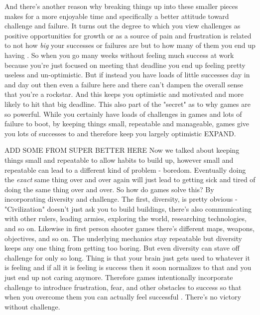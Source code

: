 \documentclass[11pt,a5paper]{book}
\begin{document}
And there's another reason why breaking things up into these smaller pieces makes for a more enjoyable time and specifically a better attitude toward challenge and failure. It turns out the degree to which you view challenges as positive opportunities for growth or as a source of pain and frustration is related to not how \textit{big} your successes or failures are but to how many of them you end up having \cite{superbetter}. So when you go many weeks without feeling much success at work because you're just focused on meeting that deadline you end up feeling pretty useless and un-optimistic. But if instead you have loads of little successes day in and day out then even a failure here and there can't dampen the overall sense that you're a rockstar. And this keeps you optimistic and motivated and more likely to hit that big deadline. This also part of the "secret" as to why games are so powerful. While you certainly have loads of challenges in games and lots of failure to boot, by keeping things small, repeatable and manageable, games give you lots of successes to and therefore keep you largely optimistic \cite{superbetter} EXPAND.
\newline

ADD SOME FROM SUPER BETTER HERE Now we talked about keeping things small and repeatable to allow habits to build up, however small and repeatable can lead to a different kind of problem - boredom. Eventually doing the \textit{exact} same thing over and over again will just lead to getting sick and tired of doing the same thing over and over. So how do games solve this? By incorporating diversity and challenge. The first, diversity, is pretty obvious - "Civilization" doesn't just ask you to build buildings, there's also communicating with other rulers, leading armies, exploring the world, researching technologies, and so on. Likewise in first person shooter games there's different maps, weapons, objectives, and so on. The underlying mechanics stay repeatable but diversity keeps any one thing from getting too boring. But even diversity can stave off challenge for only so long. Thing is that your brain just gets used to whatever it is feeling and if all it is feeling is success then it soon normalizes to that and you just end up not caring anymore. Therefore games intentionally incorporate challenge to introduce frustration, fear, and other obstacles to success so that when you overcome them you can actually feel successful \cite{superbetter}. There's no victory without challenge. 
\newline
\end{document}
